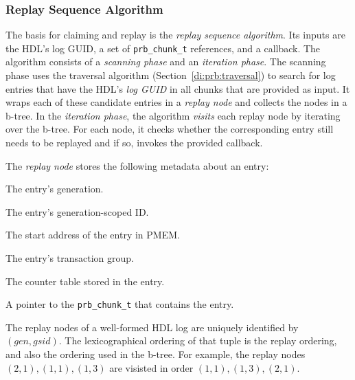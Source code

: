 \documentclass[12pt,a4paper,twoside]{book}
\begin{document}
\subsubsection{Replay Sequence Algorithm}
The basis for claiming and replay is the \textit{replay sequence algorithm}.
Its inputs are the HDL's log GUID, a set of \lstinline{prb_chunk_t} references, and a callback.
The algorithm consists of a \textit{scanning phase} and an \textit{iteration phase}.
The scanning phase uses the traversal algorithm (Section~\ref{di:prb:traversal}) to search for log entries that have the HDL's \textit{log GUID} in all chunks that are provided as input.
It wraps each of these candidate entries in a \textit{replay node} and collects the nodes in a b-tree.
In the \textit{iteration phase}, the algorithm \textit{visits} each replay node by iterating over the b-tree.
For each node, it checks whether the corresponding entry still needs to be replayed and if so, invokes the provided callback.

The \textit{replay node} stores the following metadata about an entry:
\begin{description}[noitemsep,leftmargin=1.5cm,labelindent=1cm]
    \item[Generation (gen)] The entry's generation.
    \item[Generation-Scoped ID (gsid)] The entry's generation-scoped ID.
    \item[PMEM Address] The start address of the entry in PMEM.
    \item[Transaction Group (txg)] The entry's transaction group.
    \item[Counter Table] The counter table stored in the entry.
    \item[Pointer To Chunk (chunk\_ref)] A pointer to the \lstinline{prb_chunk_t} that contains the entry.
\end{description}
The replay nodes of a well-formed HDL log are uniquely identified by $(gen, gsid)$.
The lexicographical ordering of that tuple is the replay ordering, and also the ordering used in the b-tree.
For example, the replay nodes $(2,1), (1,1), (1,3)$ are visisted in order $(1,1), (1,3), (2,1)$.
\end{document}
